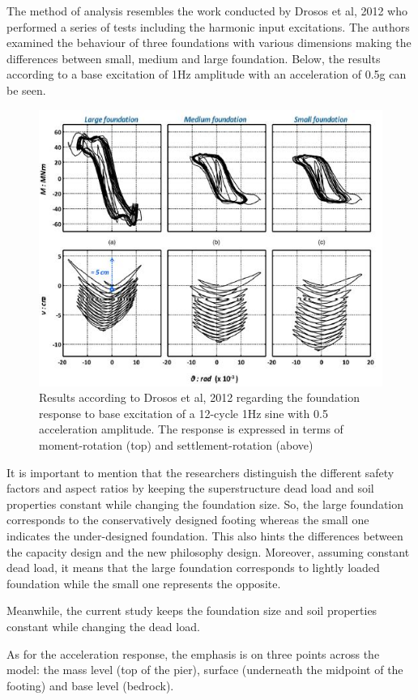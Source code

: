 The method of analysis resembles the work conducted by Drosos et al, 2012 \cite{drosos2012soil} who performed a series of tests including the harmonic input excitations. The authors \mbox{examined} the behaviour of three foundations with various dimensions making the differences between small, medium and large foundation. Below, the results according to a base excitation of 1Hz amplitude with an acceleration of 0.5g can be seen.

\begin{figure}
	\centering
	\includegraphics[width=0.7\linewidth]{"drosos2"}
	\caption{Results according to Drosos et al, 2012 regarding the foundation response to base excitation of a 12-cycle 1Hz sine with 0.5 acceleration amplitude. The response is expressed in terms of moment-rotation (top) and settlement-rotation (above)}
	\label{drosos}
\end{figure}

It is important to mention that the researchers distinguish the different safety factors and aspect ratios by keeping the superstructure dead load and soil properties constant while changing the foundation size. So, the large foundation corresponds to the \mbox{conservatively} designed footing whereas the small one indicates the under-designed foundation. This also hints the differences between the capacity design and the new philosophy design. Moreover, assuming constant dead load, it means that the large foundation corresponds to lightly loaded foundation while the small one represents the opposite. 

Meanwhile, the current study keeps the foundation size and soil properties constant while changing the dead load. 

As for the acceleration response, the emphasis is on three points across the model: the mass level (top of the pier), surface (underneath the midpoint of the footing) and base level (bedrock). 



